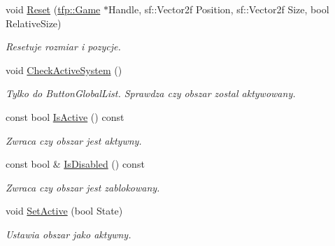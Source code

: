 \begin{DoxyCompactItemize}
void \mbox{\hyperlink{classtfp_1_1_dragable_area_a3142a5b247faf918af0b2bbc557707db}{Reset}} (\mbox{\hyperlink{classtfp_1_1_game}{tfp\+::\+Game}} $\ast$Handle, sf\+::\+Vector2f Position, sf\+::\+Vector2f Size, bool Relative\+Size)
\begin{DoxyCompactList}\small\item\em Resetuje rozmiar i pozycje. \end{DoxyCompactList}\item 
\mbox{\label{classtfp_1_1_dragable_area_a1cd099aa0da737d1497e15d65c215ff6}} 
void \mbox{\hyperlink{classtfp_1_1_dragable_area_a1cd099aa0da737d1497e15d65c215ff6}{Check\+Active\+System}} ()
\begin{DoxyCompactList}\small\item\em Tylko do Button\+Global\+List. Sprawdza czy obszar zostal aktywowany. \end{DoxyCompactList}\item 
\mbox{\label{classtfp_1_1_dragable_area_a8d768756ed7fe3184e54c53967c6b6da}} 
const bool \mbox{\hyperlink{classtfp_1_1_dragable_area_a8d768756ed7fe3184e54c53967c6b6da}{Is\+Active}} () const
\begin{DoxyCompactList}\small\item\em Zwraca czy obszar jest aktywny. \end{DoxyCompactList}\item 
\mbox{\label{classtfp_1_1_dragable_area_a49875c6c9c67aced70cbdf5e5b2cec75}} 
const bool \& \mbox{\hyperlink{classtfp_1_1_dragable_area_a49875c6c9c67aced70cbdf5e5b2cec75}{Is\+Disabled}} () const
\begin{DoxyCompactList}\small\item\em Zwraca czy obszar jest zablokowany. \end{DoxyCompactList}\item 
\mbox{\label{classtfp_1_1_dragable_area_a94fb0516e10190084215ab8db4d37b61}} 
void \mbox{\hyperlink{classtfp_1_1_dragable_area_a94fb0516e10190084215ab8db4d37b61}{Set\+Active}} (bool State)
\begin{DoxyCompactList}\small\item\em Ustawia obszar jako aktywny. \end{DoxyCompactList}\item 

\end{DoxyCompactItemize}
